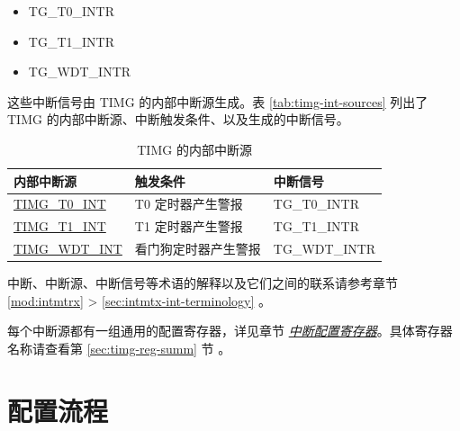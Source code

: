 \documentclass[main\_\_CN.tex]{subfiles}
\begin{document}
    \begin{itemize}
        \item TG\_T0\_INTR
        \item TG\_T1\_INTR
        \item TG\_WDT\_INTR
    \end{itemize}

这些中断信号由 TIMG 的内部中断源生成。表 \ref{tab:timg-int-sources} \textit{} 列出了 TIMG 的内部中断源、中断触发条件、以及生成的中断信号。

\begin{longtable}{ | L{5cm} | L{6.5cm} | L{4cm} | }
\caption{TIMG 的内部中断源}
\label{tab:timg-int-sources}
\\ \hline
{}
\textbf{内部中断源} & \textbf{触发条件}  &  \textbf{中断信号}\\ \hline
\label{int:TIMGT0INT}\hyperref[int:TIMGT0INT]{TIMG\_T0\_INT}  &  T0 定时器产生警报 &  TG\_T0\_INTR  \\ \hline
\label{int:TIMGT1INT}\hyperref[int:TIMGT1INT]{TIMG\_T1\_INT}  &  T1 定时器产生警报 &  TG\_T1\_INTR  \\ \hline
\label{int:TIMGWDTINT}\hyperref[int:TIMGWDTINT]{TIMG\_WDT\_INT} &  看门狗定时器产生警报 & TG\_WDT\_INTR \\ \hline
\end{longtable}

\begin{tiplisting}
中断、中断源、中断信号等术语的解释以及它们之间的联系请参考章节 \ref{mod:intmtrx} \textit{} > \ref{sec:intmtx-int-terminology} \textit{}。
\end{tiplisting}

每个中断源都有一组通用的配置寄存器，详见章节 \hyperref[interrupt-config-registers]{\textit{中断配置寄存器}}。具体寄存器名称请查看第 \ref{sec:timg-reg-summ} 节 \textit{}。


\section{配置流程}
\label{sec:timg-prog-procedures}
\end{document}
